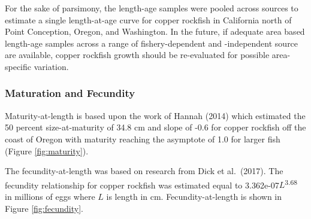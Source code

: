 \documentclass[11pt,
  english,
  a4paper,
]{article}
\begin{document}
\leavevmode\tagmcend\tagstructend\par


For the sake of parsimony, the length-age samples were pooled across sources to estimate a single length-at-age curve for copper rockfish in California north of Point Conception, Oregon, and Washington. In the future, if adequate area based length-age samples across a range of fishery-dependent and -independent source are available, copper rockfish growth should be re-evaluated for possible area-specific variation.

\leavevmode\tagmcend\tagstructend\par


\hypertarget{maturation-and-fecundity}{%
\subsubsection{Maturation and Fecundity}\label{maturation-and-fecundity}}

\leavevmode\tagmcend\tagstructend


Maturity-at-length is based upon the work of Hannah {(2014)\leavevmode\tagmcend\tagstructend} which estimated the 50 percent size-at-maturity of 34.8 cm and slope of -0.6 for copper rockfish off the coast of Oregon with maturity reaching the asymptote of 1.0 for larger fish (Figure \ref{fig:maturity}).

\leavevmode\tagmcend\tagstructend\par


The fecundity-at-length was based on research from Dick et al.~{(2017)\leavevmode\tagmcend\tagstructend}. The fecundity relationship for copper rockfish was estimated equal to 3.362e-07{\(L\)\leavevmode\tagmcend\tagstructend}\textsuperscript{3.68} in millions of eggs where {\(L\)\leavevmode\tagmcend\tagstructend} is length in cm. Fecundity-at-length is shown in Figure \ref{fig:fecundity}.

\leavevmode\tagmcend\tagstructend\par
\end{document}
